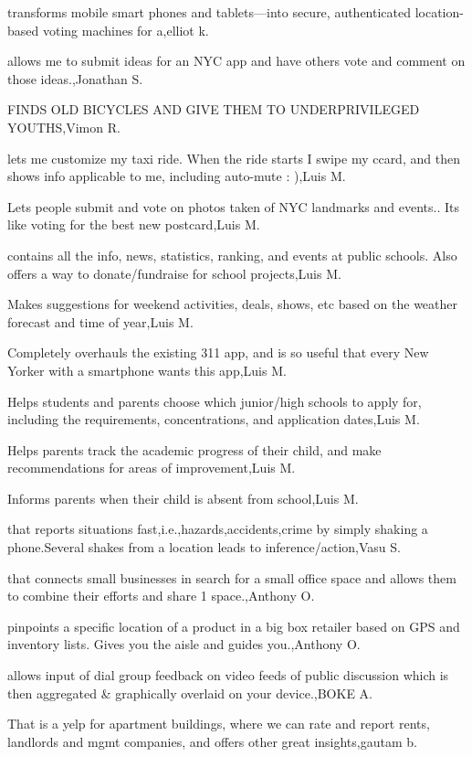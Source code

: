 \documentclass{article}
\begin{document}
transforms mobile smart phones and tablets—into secure, authenticated location-based voting machines for a,elliot k.

allows me to submit ideas for an NYC app and have others vote and comment on those ideas.,Jonathan S.

FINDS OLD BICYCLES AND GIVE THEM TO UNDERPRIVILEGED YOUTHS,Vimon R.

lets me customize my taxi ride. When the ride starts I swipe my ccard, and then shows info applicable to me, including auto-mute : ),Luis M.

Lets people submit and vote on photos taken of NYC landmarks and events.. Its like voting for the best new postcard,Luis M.

contains all the info, news, statistics, ranking, and events at public schools. Also offers a way to donate/fundraise for school projects,Luis M.

Makes suggestions for weekend activities, deals, shows, etc based on the weather forecast and time of year,Luis M.

Completely overhauls the existing 311 app, and is so useful that every New Yorker with a smartphone wants this app,Luis M.

Helps students and parents choose which junior/high schools to apply for, including the requirements, concentrations, and application dates,Luis M.

Helps parents track the academic progress of their child, and make recommendations for areas of improvement,Luis M.

Informs parents when their child is absent from school,Luis M.

that reports situations fast,i.e.,hazards,accidents,crime by simply shaking a phone.Several shakes from a location leads to inference/action,Vasu S.

that connects small businesses in search for a small office space and allows them to combine their efforts and share 1 space.,Anthony O.

pinpoints a specific location of a product in a big box retailer based on GPS and inventory lists.  Gives you the aisle and guides you.,Anthony O.

allows  input of  dial group feedback on video feeds of public discussion which is then aggregated \& graphically overlaid  on your device.,BOKE A.

That is a yelp for apartment buildings, where we can rate and report rents, landlords and mgmt companies, and offers other great insights,gautam b.
\end{document}
